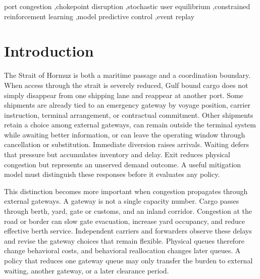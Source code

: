 \documentclass[a4paper,fleqn]{cas-sc}
\begin{document}
\begin{keywords}
port congestion \sep chokepoint disruption \sep stochastic user equilibrium
\sep constrained reinforcement learning \sep model predictive control
\sep event replay
\end{keywords}


\maketitle

\section{Introduction}

The Strait of Hormuz is both a maritime passage and a coordination boundary.
When access through the strait is severely reduced, Gulf bound cargo does not
simply disappear from one shipping lane and reappear at another port. Some
shipments are already tied to an emergency gateway by voyage position, carrier
instruction, terminal arrangement, or contractual commitment. Other shipments
retain a choice among external gateways, can remain outside the terminal system
while awaiting better information, or can leave the operating window through
cancellation or substitution. Immediate diversion raises arrivals. Waiting
defers that pressure but accumulates inventory and delay. Exit reduces physical
congestion but represents an unserved demand outcome. A useful mitigation model
must distinguish these responses before it evaluates any policy.

This distinction becomes more important when congestion propagates through
external gateways. A gateway is not a single capacity number. Cargo passes
through berth, yard, gate or customs, and an inland corridor. Congestion at the
road or border can slow gate evacuation, increase yard occupancy, and reduce
effective berth service. Independent carriers and forwarders observe these
delays and revise the gateway choices that remain flexible. Physical queues
therefore change behavioral costs, and behavioral reallocation changes later
queues. A policy that reduces one gateway queue may only transfer the burden to
external waiting, another gateway, or a later clearance period.
\end{document}
